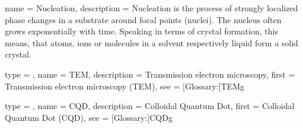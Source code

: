 	{
	name				= {Nucleation},
	description	= {Nucleation is the process of strongly localized phase changes in a substrate around focal points (nuclei).
								 The nucleus often grows exponentially with time.
								 Speaking in terms of crystal formation, this means, that atoms, ions or molecules in a solvent respectively liquid form
								 a solid crystal.}
	}





	{
	type				= \acronymtype,
	name				= {TEM},
	description	= {Transmission electron microscopy},
	first				= {Transmission electron microscopy (TEM)},
	see					=	[Glossary:]{TEMg}
	}
	
	{
	type				= \acronymtype,
	name				= {CQD},
	description	= {Colloidal Quantum Dot},
	first				= {Colloidal Quantum Dot (CQD)},
	see					=	[Glossary:]{CQDg}
	}